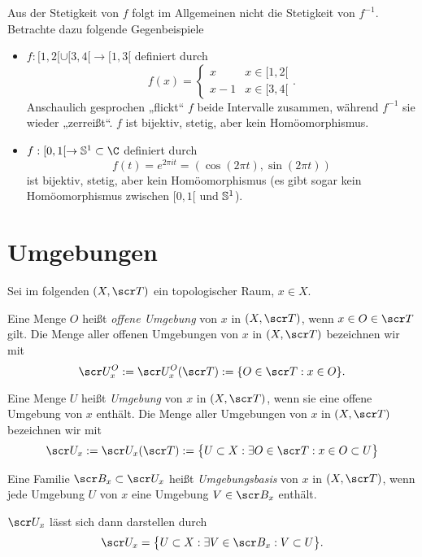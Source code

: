 \begin{nt}
	Aus der Stetigkeit von $f$ folgt im Allgemeinen nicht die Stetigkeit von $f^{-1}$.
	Betrachte dazu folgende Gegenbeispiele
	\begin{itemize}
		\item
			$f: [1,2[ \cup [3,4[ \to [1,3[$ definiert durch
			\[
				f(x) = \begin{cases}
					x & x \in [1,2[ \\
					x - 1 & x \in [3,4[
				\end{cases}.
			\]
			Anschaulich gesprochen „flickt“ $f$ beide Intervalle zusammen, während $f^{-1}$ sie wieder „zerreißt“.
			$f$ ist bijektiv, stetig, aber kein Homöomorphismus.
		\item
			$f : [0,1[ \to \S^1 \subset \C$ definiert durch
			\[
				f(t)
				= e^{2\pi i t}
				= (\cos (2\pi t), \sin (2\pi t))
			\]
			ist bijektiv, stetig, aber kein Homöomorphismus (es gibt sogar kein Homöomorphismus zwischen $[0,1[$ und $\S^1$).
	\end{itemize}
\end{nt}


\section{Umgebungen}


Sei im folgenden $(X, \scr T)$ ein topologischer Raum, $x \in X$.

\begin{df}
	Eine Menge $O$ heißt \emph{offene Umgebung} von $x$ in $(X,\scr T)$, wenn $x \in O \in \scr T$ gilt.
	Die Menge aller offenen Umgebungen von $x$ in $(X, \scr T)$ bezeichnen wir mit
	\[
		\scr U_x^O := \scr U_x^O(\scr T)
		:= \{ O \in \scr T : x \in O \}.
	\]

	Eine Menge $U$ heißt \emph{Umgebung} von $x$ in $(X, \scr T)$, wenn sie eine offene Umgebung von $x$ enthält.
	Die Menge aller Umgebungen von $x$ in $(X, \scr T)$ bezeichnen wir mit
	\[
		\scr U_x := \scr U_x(\scr T)
		:= \big\{ U \subset X : \exists O \in \scr T : x \in O \subset U \big\}
	\]
\end{df}

\begin{df}
	Eine Familie $\scr B_x \subset \scr U_x$ heißt \emph{Umgebungsbasis} von $x$ in $(X, \scr T)$, wenn jede Umgebung $U$ von $x$ eine Umgebung $V \in \scr B_x$ enthält.

	$\scr U_x$ lässt sich dann darstellen durch
	\[
		\scr U_x = \big\{ U \subset X : \exists V \in \scr B_x : V \subset U \big\}.
	\]
\end{df}

